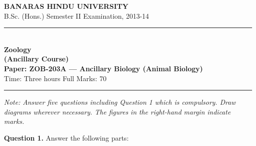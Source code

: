 \documentclass[11pt,a4paper]{article}
\begin{document}
\begin{center}
  {\large\bfseries BANARAS HINDU UNIVERSITY}\\[2pt]
  {\normalsize B.Sc. (Hons.) Semester II Examination, 2013-14}\\[6pt]
  \rule{0.8\linewidth}{0.5pt}\\[6pt]
  {\large\bfseries Zoology}\\[4pt]
  {\large\bfseries (Ancillary Course)}\\[4pt]
  {\large\bfseries Paper: ZOB-203A --- Ancillary Biology (Animal Biology)}\\[4pt]
  {\normalsize Time: Three hours \hfill Full Marks: 70}
\end{center}

\rule{\linewidth}{0.4pt}

\smallskip



\noindent   \textit{Note: Answer five questions including Question 1 which is compulsory. Draw diagrams wherever necessary. The figures in the right-hand margin indicate marks.}

\bigskip




\noindent   \textbf{Question 1.} Answer the following parts:
\end{document}
